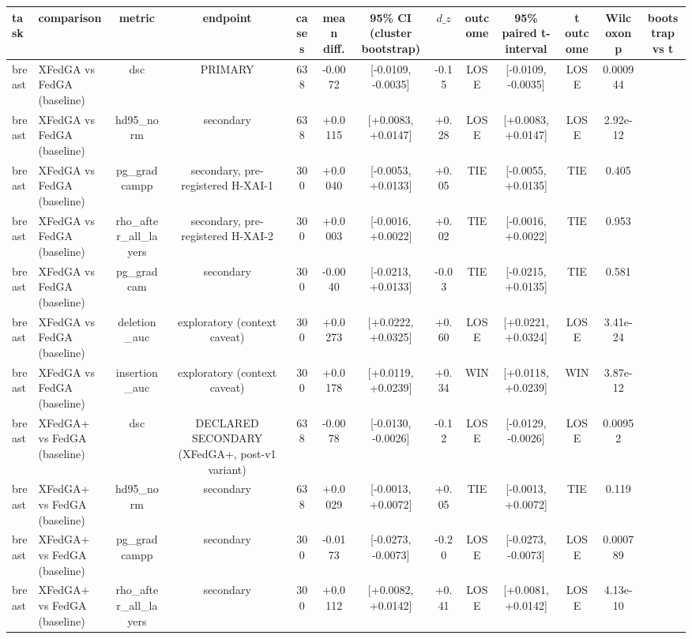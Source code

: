 \begin{tabular}{llccccccccccc}
\hline
task & comparison & metric & endpoint & cases & mean diff. & 95\% CI (cluster bootstrap) & $d\_z$ & outcome & 95\% paired t-interval & t outcome & Wilcoxon p & bootstrap vs t \\
\hline
breast & XFedGA vs FedGA (baseline) & dsc & PRIMARY & 638 & -0.0072 & [-0.0109, -0.0035] & -0.15 & LOSE & [-0.0109, -0.0035] & LOSE & 0.000944 &  \\
breast & XFedGA vs FedGA (baseline) & hd95\_norm & secondary & 638 & +0.0115 & [+0.0083, +0.0147] & +0.28 & LOSE & [+0.0083, +0.0147] & LOSE & 2.92e-12 &  \\
breast & XFedGA vs FedGA (baseline) & pg\_gradcampp & secondary, pre-registered H-XAI-1 & 300 & +0.0040 & [-0.0053, +0.0133] & +0.05 & TIE & [-0.0055, +0.0135] & TIE & 0.405 &  \\
breast & XFedGA vs FedGA (baseline) & rho\_after\_all\_layers & secondary, pre-registered H-XAI-2 & 300 & +0.0003 & [-0.0016, +0.0022] & +0.02 & TIE & [-0.0016, +0.0022] & TIE & 0.953 &  \\
breast & XFedGA vs FedGA (baseline) & pg\_gradcam & secondary & 300 & -0.0040 & [-0.0213, +0.0133] & -0.03 & TIE & [-0.0215, +0.0135] & TIE & 0.581 &  \\
breast & XFedGA vs FedGA (baseline) & deletion\_auc & exploratory (context caveat) & 300 & +0.0273 & [+0.0222, +0.0325] & +0.60 & LOSE & [+0.0221, +0.0324] & LOSE & 3.41e-24 &  \\
breast & XFedGA vs FedGA (baseline) & insertion\_auc & exploratory (context caveat) & 300 & +0.0178 & [+0.0119, +0.0239] & +0.34 & WIN & [+0.0118, +0.0239] & WIN & 3.87e-12 &  \\
breast & XFedGA+ vs FedGA (baseline) & dsc & DECLARED SECONDARY (XFedGA+, post-v1 variant) & 638 & -0.0078 & [-0.0130, -0.0026] & -0.12 & LOSE & [-0.0129, -0.0026] & LOSE & 0.00952 &  \\
breast & XFedGA+ vs FedGA (baseline) & hd95\_norm & secondary & 638 & +0.0029 & [-0.0013, +0.0072] & +0.05 & TIE & [-0.0013, +0.0072] & TIE & 0.119 &  \\
breast & XFedGA+ vs FedGA (baseline) & pg\_gradcampp & secondary & 300 & -0.0173 & [-0.0273, -0.0073] & -0.20 & LOSE & [-0.0273, -0.0073] & LOSE & 0.000789 &  \\
breast & XFedGA+ vs FedGA (baseline) & rho\_after\_all\_layers & secondary & 300 & +0.0112 & [+0.0082, +0.0142] & +0.41 & LOSE & [+0.0081, +0.0142] & LOSE & 4.13e-10 &  \\

\end{tabular}
